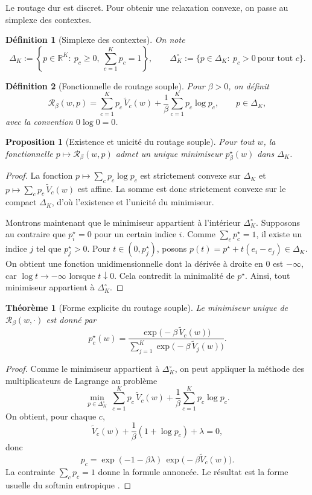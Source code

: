\documentclass[11pt,a4paper]{article}
\newtheorem{definition}{Définition}[section]
\newtheorem{proposition}{Proposition}[section]
\newtheorem{theorem}{Théorème}[section]
\newcommand{\R}{\mathbb R}
\newcommand{\Rcal}{\mathcal R}
\begin{document}
Le routage dur est discret. Pour obtenir une relaxation convexe, on passe au simplexe des contextes.

\begin{definition}[Simplexe des contextes]
On note
\[
\Delta_K:=\left\{p\in\R^K:\ p_c\ge 0,\ \sum_{c=1}^K p_c=1\right\},
\qquad
\Delta_K^\circ:=\{p\in\Delta_K:\ p_c>0\ \text{pour tout }c\}.
\]
\end{definition}

\begin{definition}[Fonctionnelle de routage souple]
Pour \(\beta>0\), on définit
\[
\Rcal_\beta(w,p)
=
\sum_{c=1}^K p_c\,\widetilde V_c(w)
+\frac{1}{\beta}\sum_{c=1}^K p_c\log p_c,
\qquad p\in\Delta_K,
\]
avec la convention \(0\log 0=0\).
\end{definition}

\begin{proposition}[Existence et unicité du routage souple]
Pour tout \(w\), la fonctionnelle \(p\mapsto \Rcal_\beta(w,p)\) admet un unique minimiseur \(p^\star_\beta(w)\) dans \(\Delta_K\).
\end{proposition}

\begin{proof}
La fonction \(p\mapsto \sum_c p_c\log p_c\) est strictement convexe sur \(\Delta_K\) et \(p\mapsto \sum_c p_c\,\widetilde V_c(w)\) est affine. La somme est donc strictement convexe sur le compact \(\Delta_K\), d'où l'existence et l'unicité du minimiseur.

Montrons maintenant que le minimiseur appartient à l'intérieur \(\Delta_K^\circ\). Supposons au contraire que \(p^\star_i=0\) pour un certain indice \(i\). Comme \(\sum_c p^\star_c=1\), il existe un indice \(j\) tel que \(p^\star_j>0\). Pour \(t\in(0,p^\star_j)\), posons \(p(t)=p^\star+t(e_i-e_j)\in\Delta_K\). On obtient une fonction unidimensionnelle dont la dérivée à droite en \(0\) est \(-\infty\), car \(\log t\to-\infty\) lorsque \(t\downarrow 0\). Cela contredit la minimalité de \(p^\star\). Ainsi, tout minimiseur appartient à \(\Delta_K^\circ\).
\end{proof}

\begin{theorem}[Forme explicite du routage souple]
Le minimiseur unique de \(\Rcal_\beta(w,\cdot)\) est donné par
\[
p_c^\star(w)=\frac{\exp\!\bigl(-\beta\,\widetilde V_c(w)\bigr)}
{\sum_{j=1}^K \exp\!\bigl(-\beta\,\widetilde V_j(w)\bigr)}.
\]
\end{theorem}

\begin{proof}
Comme le minimiseur appartient à \(\Delta_K^\circ\), on peut appliquer la méthode des multiplicateurs de Lagrange au problème
\[
\min_{p\in\Delta_K^\circ}\ \sum_{c=1}^K p_c\,\widetilde V_c(w)+\frac{1}{\beta}\sum_{c=1}^K p_c\log p_c.
\]
On obtient, pour chaque \(c\),
\[
\widetilde V_c(w)+\frac{1}{\beta}(1+\log p_c)+\lambda=0,
\]
donc
\[
p_c=\exp(-1-\beta\lambda)\,\exp\!\bigl(-\beta\widetilde V_c(w)\bigr).
\]
La contrainte \(\sum_c p_c=1\) donne la formule annoncée. Le résultat est la forme usuelle du softmin entropique \cite{BauschkeCombettes2017,RockafellarWets1998}.
\end{proof}
\end{document}
